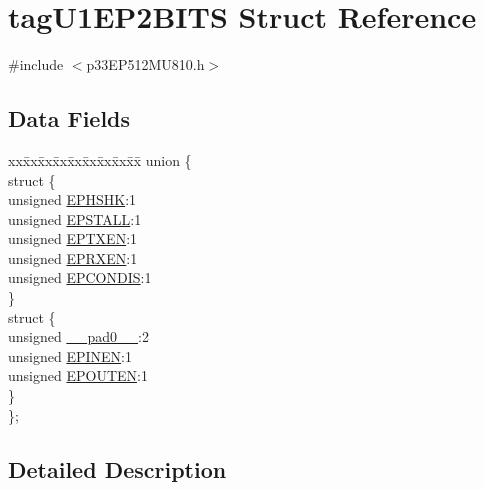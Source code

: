 \hypertarget{structtag_u1_e_p2_b_i_t_s}{}\section{tag\+U1\+E\+P2\+B\+I\+TS Struct Reference}
\label{structtag_u1_e_p2_b_i_t_s}


{\ttfamily \#include $<$p33\+E\+P512\+M\+U810.\+h$>$}

\subsection*{Data Fields}
\begin{DoxyCompactItemize}
\item 
\begin{tabbing}
xx\=xx\=xx\=xx\=xx\=xx\=xx\=xx\=xx\=\kill
union \{\\
\>struct \{\\
\>\>unsigned \hyperlink{structtag_u1_e_p2_b_i_t_s_a0d06430217cb4b189fbe9d0c4b460482}{EPHSHK}:1\\
\>\>unsigned \hyperlink{structtag_u1_e_p2_b_i_t_s_a47042104f04ebe06a23f9789bd400d7e}{EPSTALL}:1\\
\>\>unsigned \hyperlink{structtag_u1_e_p2_b_i_t_s_aa2d88c1be513e759c136823c86a355b4}{EPTXEN}:1\\
\>\>unsigned \hyperlink{structtag_u1_e_p2_b_i_t_s_a8a388d32ceffb87230e660b6793f2857}{EPRXEN}:1\\
\>\>unsigned \hyperlink{structtag_u1_e_p2_b_i_t_s_a1bd26df05d2b5a11b20ee548fce90c3e}{EPCONDIS}:1\\
\>\} \\
\>struct \{\\
\>\>unsigned \hyperlink{structtag_u1_e_p2_b_i_t_s_adf71f3d8410c1f1dbbc96680a92c49af}{\_\_pad0\_\_}:2\\
\>\>unsigned \hyperlink{structtag_u1_e_p2_b_i_t_s_a8b6d98cdf233ac90ff19d16d9a89215e}{EPINEN}:1\\
\>\>unsigned \hyperlink{structtag_u1_e_p2_b_i_t_s_adf87e8acfbb27a5626e21b3e3bd106fd}{EPOUTEN}:1\\
\>\} \\
\}; \\

\end{tabbing}\end{DoxyCompactItemize}


\subsection{Detailed Description}


